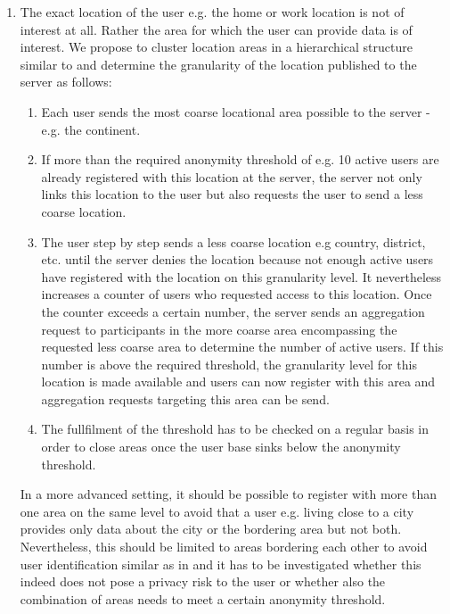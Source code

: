  \begin{enumerate}
 	\item The exact location of the user e.g. the home or work location is not of interest at all. Rather the area for which the user can provide data is of interest. We propose to cluster location areas in a hierarchical structure similar to \parencite{casper} and determine the granularity of the location published to the server as follows:
 	\begin{enumerate}
 		\item Each user sends the most coarse locational area possible to the server - e.g. the continent.
 		\item If more than the required anonymity threshold of e.g. 10 active users are already registered with this location at the server, the server not only links this location to the user but also requests the user to send a less coarse location.
 		\item The user step by step sends a less coarse location e.g country, district, etc. until the server denies the location because not enough active users have registered with the location on this granularity level. It nevertheless increases a counter of users who requested access to this location. Once the counter exceeds a certain number, the server sends an aggregation request to participants in the more coarse area encompassing the requested less coarse area to determine the number of active users. If this number is above the required threshold, the granularity level for this location is made available and users can now register with this area and aggregation requests targeting this area can be send.
 		\item The fullfilment of the threshold has to be checked on a regular basis in order to close areas once the user base sinks below the anonymity threshold.
 	\end{enumerate}
 	In a more advanced setting, it should be possible to register with more than one area on the same level to avoid that a user e.g. living close to a city provides only data about the city or the bordering area but not both. Nevertheless, this should be limited to areas bordering each other to avoid user identification similar as in \parencite{privacy-home-work-pairs} and it has to be investigated whether this indeed does not pose a privacy risk to the user or whether also the combination of areas needs to meet a certain anonymity threshold.
 \end{enumerate}